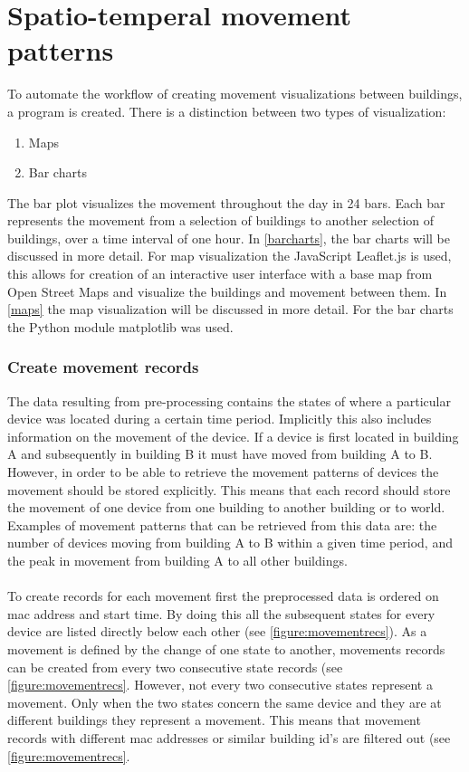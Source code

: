 \chapter{Spatio-temperal movement patterns}

To automate the workflow of creating movement visualizations between buildings, a program is created. There is a distinction between two types of visualization:
\begin{enumerate}
\item Maps
\item Bar charts
\end{enumerate}
The bar plot visualizes the movement throughout the day in 24 bars. Each bar represents the movement from a selection of buildings to another selection of buildings, over a time interval of one hour. In \autoref{barcharts}, the bar charts will be discussed in more detail. For map visualization the JavaScript Leaflet.js is used, this allows for creation of an interactive user interface with a base map from Open Street Maps and visualize the buildings and movement between them. In \autoref{maps} the map visualization will be discussed in more detail. For the bar charts the Python module matplotlib was used.

\subsection{Create movement records}
The data resulting from pre-processing contains the states of where a particular device was located during a certain time period. Implicitly this also includes information on the movement of the device. If a device is first located in building A and subsequently in building B it must have moved from building A to B. However, in order to be able to retrieve the movement patterns of devices the movement should be stored explicitly. This means that each record should store the movement of one device from one building to another building or to world. Examples of movement patterns that can be retrieved from this data are: the number of devices moving from building A to B within a given time period, and the peak in movement from building A to all other buildings. 
\\\\
To create records for each movement first the preprocessed data is ordered on mac address and start time. By doing this all the subsequent states for every device are listed directly below each other (see \autoref{figure:movementrecs}). As a movement is defined by the change of one state to another, movements records can be created from every two consecutive state records (see \autoref{figure:movementrecs}. However, not every two consecutive states represent a movement. Only when the two states concern the same device and they are at different buildings they represent a movement. This means that movement records with different mac addresses or similar building id’s are filtered out (see \autoref{figure:movementrecs}.\\

